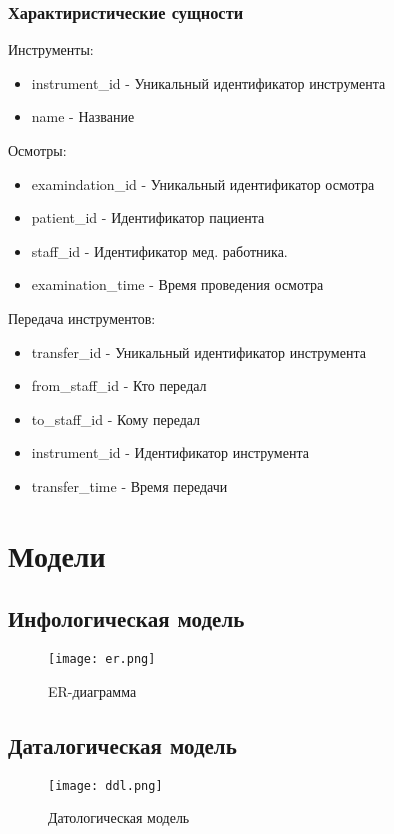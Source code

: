 \documentclass[14pt]{extreport}
\begin{document}
        \subsection{Характиристические сущности}
            Инструменты:
            \begin{itemize}
                \item instrument\_id - Уникальный идентификатор инструмента
                \item name - Название
            \end{itemize}
            \bigskip


        Осмотры:
        \begin{itemize}
            \item examindation\_id - Уникальный идентификатор осмотра
            \item patient\_id - Идентификатор пациента
            \item staff\_id - Идентификатор мед. работника.
            \item examination\_time - Время проведения осмотра
        \end{itemize}
    \bigskip


    Передача инструментов:
    \begin{itemize}
        \item transfer\_id - Уникальный идентификатор инструмента
        \item from\_staff\_id - Кто передал
        \item to\_staff\_id - Кому передал
        \item instrument\_id - Идентификатор инструмента
        \item transfer\_time - Время передачи
    \end{itemize}


    \chapter{Модели}
    \section{Инфологическая модель}
            \begin{figure}[h]
                \centering
                \texttt{[image: er.png]}
                \caption{ ER-диаграмма}
                \label{fig:d1}
            \end{figure}
    \section{Даталогическая модель}
            \begin{figure}[h]
                \centering
                \texttt{[image: ddl.png]}
                \caption{ Датологическая модель}
                \label{fig:d2}
            \end{figure}
\newpage
\end{document}
